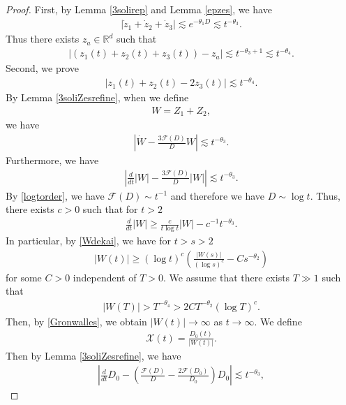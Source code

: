 \documentclass[reqno]{amsart}
\theoremstyle{plain}
\theoremstyle{definition}
\numberwithin{equation}{section}
\newcommand{\1}{\mathbbm{1}}
\begin{document}
\begin{proof}
First, by Lemma \ref{3solirep} and Lemma \ref{epzes}, we have
\begin{align*}
\left|\dot{z}_1+\dot{z}_2+\dot{z}_3\right|\lesssim e^{-\theta_1 D}\lesssim t^{-\theta_3}.
\end{align*}
Thus there exists $z_a\in \mathbb{R}^d$ such that 
\begin{align}\label{jushines}
\left|(z_1(t)+z_2(t)+z_3(t))-z_a\right|\lesssim t^{-\theta_3+1}\lesssim t^{-\theta_4}.
\end{align}
Second, we prove
\begin{align}\label{mannnakaes}
\left|z_1(t)+z_2(t)-2z_3(t)\right|\lesssim t^{-\theta_4}.
\end{align}
By Lemma \ref{3soliZesrefine}, when we define
\begin{align*}
W=Z_1+Z_2,
\end{align*}
we have
\begin{align}\label{Wes}
\left|\dot{W}-\frac{3\mathcal{F}(D)}{D}W\right|\lesssim t^{-\theta_3}.
\end{align}
Furthermore, we have
\begin{align}\label{Wes2}
\left| \frac{d}{dt}|W|-\frac{3\mathcal{F}(D)}{D}|W|\right|\lesssim t^{-\theta_3}.
\end{align}
By  \eqref{logtorder}, we have $\mathcal{F}(D)\sim t^{-1}$ and therefore we have $D\sim \log{t}$. Thus, there exists $c>0$ such that for $t>2$
\begin{align}\label{Wdekai}
\frac{d}{dt}|W|\geq \frac{c}{t\log{t}}|W|-c^{-1}t^{-\theta_3}.
\end{align}
In particular, by \eqref{Wdekai}, we have for $t>s>2$
\begin{align}\label{Gronwalles}
|W(t)|\geq (\log{t})^c\left(\frac{ |W(s)|}{(\log{s})^c}-Cs^{-\theta_2}\right)
\end{align}
for some $C>0$ independent of $T>0$. We assume that there exists $T\gg 1$ such that 
\begin{align*}
|W(T)|>T^{-\theta_4}>2CT^{-\theta_2}(\log{T})^c.
\end{align*}
Then, by \eqref{Gronwalles}, we obtain $|W(t)|\to \infty$ as $t\to\infty$. We define 
\begin{align*}
\mathcal{X}(t)=\frac{D_0(t)}{|W(t)|}.
\end{align*}
Then by Lemma \ref{3soliZesrefine}, we have
\begin{align*}
\left|\frac{d}{dt}D_0-\left(\frac{\mathcal{F}(D)}{D}-\frac{2\mathcal{F}(D_0)}{D_0}\right)D_0\right|\lesssim t^{-\theta_3},

\end{align*}
\end{proof}
\end{document}
